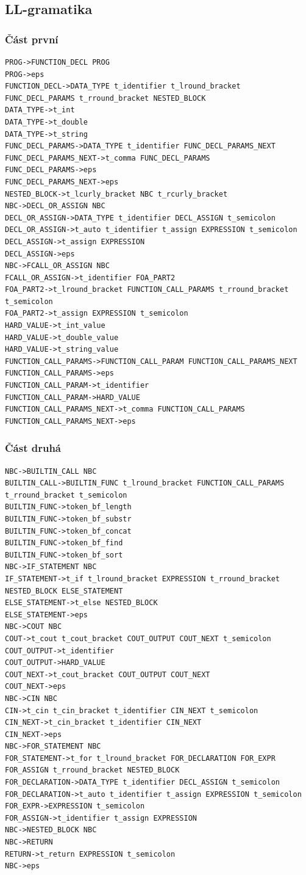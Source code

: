 \documentclass[a4paper, 12pt]{article}
\begin{document}
\begin{landscape}
\subsection{LL-gramatika} \label{subsec:llgram}

\subsubsection{Část první}
\begin{verbatim}
PROG->FUNCTION_DECL PROG
PROG->eps
FUNCTION_DECL->DATA_TYPE t_identifier t_lround_bracket FUNC_DECL_PARAMS t_rround_bracket NESTED_BLOCK
DATA_TYPE->t_int
DATA_TYPE->t_double
DATA_TYPE->t_string
FUNC_DECL_PARAMS->DATA_TYPE t_identifier FUNC_DECL_PARAMS_NEXT
FUNC_DECL_PARAMS_NEXT->t_comma FUNC_DECL_PARAMS
FUNC_DECL_PARAMS->eps
FUNC_DECL_PARAMS_NEXT->eps
NESTED_BLOCK->t_lcurly_bracket NBC t_rcurly_bracket
NBC->DECL_OR_ASSIGN NBC
DECL_OR_ASSIGN->DATA_TYPE t_identifier DECL_ASSIGN t_semicolon
DECL_OR_ASSIGN->t_auto t_identifier t_assign EXPRESSION t_semicolon
DECL_ASSIGN->t_assign EXPRESSION
DECL_ASSIGN->eps
NBC->FCALL_OR_ASSIGN NBC
FCALL_OR_ASSIGN->t_identifier FOA_PART2
FOA_PART2->t_lround_bracket FUNCTION_CALL_PARAMS t_rround_bracket t_semicolon
FOA_PART2->t_assign EXPRESSION t_semicolon
HARD_VALUE->t_int_value
HARD_VALUE->t_double_value
HARD_VALUE->t_string_value
FUNCTION_CALL_PARAMS->FUNCTION_CALL_PARAM FUNCTION_CALL_PARAMS_NEXT
FUNCTION_CALL_PARAMS->eps
FUNCTION_CALL_PARAM->t_identifier
FUNCTION_CALL_PARAM->HARD_VALUE
FUNCTION_CALL_PARAMS_NEXT->t_comma FUNCTION_CALL_PARAMS
FUNCTION_CALL_PARAMS_NEXT->eps
\end{verbatim}
\newpage

\subsubsection{Část druhá}
\begin{verbatim}
NBC->BUILTIN_CALL NBC
BUILTIN_CALL->BUILTIN_FUNC t_lround_bracket FUNCTION_CALL_PARAMS t_rround_bracket t_semicolon
BUILTIN_FUNC->token_bf_length
BUILTIN_FUNC->token_bf_substr
BUILTIN_FUNC->token_bf_concat
BUILTIN_FUNC->token_bf_find
BUILTIN_FUNC->token_bf_sort
NBC->IF_STATEMENT NBC
IF_STATEMENT->t_if t_lround_bracket EXPRESSION t_rround_bracket NESTED_BLOCK ELSE_STATEMENT
ELSE_STATEMENT->t_else NESTED_BLOCK
ELSE_STATEMENT->eps
NBC->COUT NBC
COUT->t_cout t_cout_bracket COUT_OUTPUT COUT_NEXT t_semicolon
COUT_OUTPUT->t_identifier
COUT_OUTPUT->HARD_VALUE
COUT_NEXT->t_cout_bracket COUT_OUTPUT COUT_NEXT
COUT_NEXT->eps
NBC->CIN NBC
CIN->t_cin t_cin_bracket t_identifier CIN_NEXT t_semicolon
CIN_NEXT->t_cin_bracket t_identifier CIN_NEXT
CIN_NEXT->eps
NBC->FOR_STATEMENT NBC
FOR_STATEMENT->t_for t_lround_bracket FOR_DECLARATION FOR_EXPR FOR_ASSIGN t_rround_bracket NESTED_BLOCK
FOR_DECLARATION->DATA_TYPE t_identifier DECL_ASSIGN t_semicolon
FOR_DECLARATION->t_auto t_identifier t_assign EXPRESSION t_semicolon
FOR_EXPR->EXPRESSION t_semicolon
FOR_ASSIGN->t_identifier t_assign EXPRESSION
NBC->NESTED_BLOCK NBC
NBC->RETURN
RETURN->t_return EXPRESSION t_semicolon
NBC->eps
\end{verbatim}
\end{landscape}
\newpage
\end{document}
